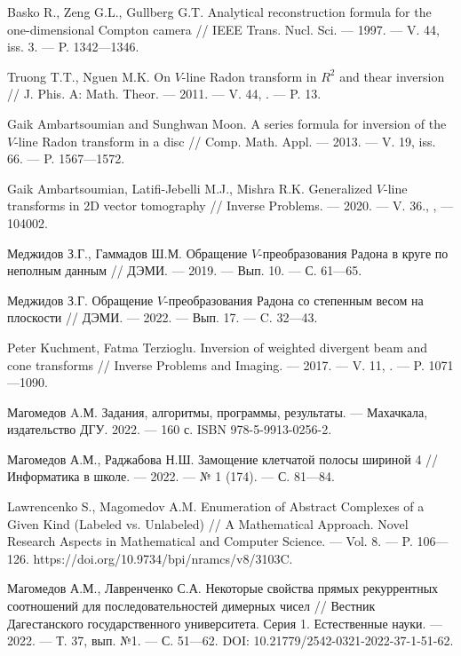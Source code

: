 \begin{thebibliography}{111}

Basko R., Zeng G.L., Gullberg G.T.
Analytical reconstruction formula for the one-dimensional Compton camera
//
IEEE Trans. Nucl. Sci.
--- 1997.
--- V. 44, iss. 3.
--- P. 1342---1346.

Truong T.T., Nguen M.K.
On $V$-line Radon transform in $R^2$ and thear inversion
//
J. Phis. A: Math. Theor.
--- 2011.
--- V. 44, .
--- P. 13.

Gaik Ambartsoumian and Sunghwan Moon.
A series formula for inversion of the $V$-line Radon transform in a disc
//
Comp. Math. Appl.
--- 2013.
--- V. 19, iss. 66.
--- P. 1567---1572.

Gaik Ambartsoumian, Latifi-Jebelli M.J., Mishra R.K.
Generalized $V$-line transforms in 2D vector tomography
//
Inverse Problems.
--- 2020.
--- V. 36., ,
--- 104002.

Меджидов З.Г., Гаммадов Ш.М.
Обращение $V$-преобразования Радона в круге по неполным данным
//
ДЭМИ.
--- 2019.
--- Вып. 10.
--- С. 61---65.

Меджидов З.Г.
Обращение $V$-преобразования Радона со степенным весом на плоскости
//
ДЭМИ.
--- 2022.
--- Вып. 17.
--- C. 32---43.

Peter Kuchment, Fatma Terzioglu.
Inversion of weighted divergent beam and cone transforms
//
Inverse Problems and Imaging.
--- 2017.
--- V. 11, .
--- P. 1071---1090.



Магомедов A.М.
Задания, алгоритмы, программы, результаты.
--- Махачкала, издательство ДГУ. 2022.
--- 160 с.
ISBN 978-5-9913-0256-2.

Магомедов А.М., Раджабова Н.Ш.
Замощение клетчатой полосы шириной 4
//
Информатика в школе.
--- 2022.
--- № 1 (174).
--- С. 81---84.

Lawrencenko S., Magomedov A.M.
Enumeration of Abstract Complexes of a Given Kind (Labeled vs. Unlabeled)
//
A Mathematical Approach. Novel Research Aspects in Mathematical and Computer Science.
--- Vol. 8.
--- P. 106---126.
https://doi.org/10.9734/bpi/nramcs/v8/3103C.

Магомедов А.М., Лавренченко С.А.
Некоторые свойства прямых рекуррентных соотношений для последовательностей димерных чисел
//
Вестник Дагестанского государственного университета. Серия 1. Естественные науки.
--- 2022.
--- Т. 37, вып. №1.
--- С. 51---62.
DOI: 10.21779/2542-0321-2022-37-1-51-62.


\end{thebibliography}
